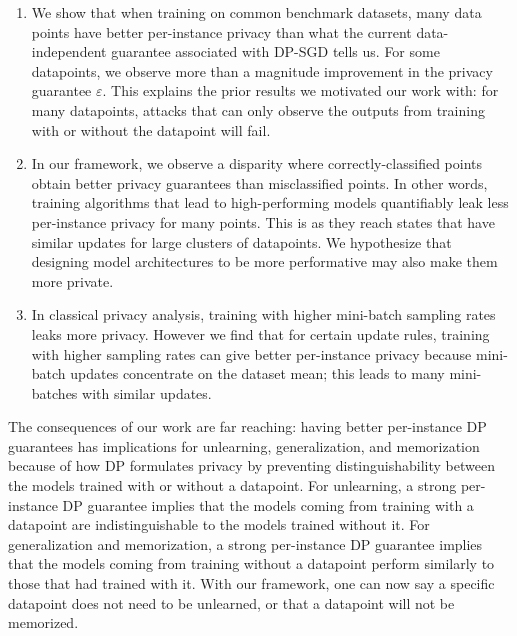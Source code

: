 \begin{enumerate}[leftmargin=*,noitemsep,topsep=0pt]
    \item We show that when training on common benchmark datasets, many data points have better per-instance privacy than what the current data-independent guarantee associated with DP-SGD tells us.
    For some datapoints, we observe more than a magnitude improvement in the privacy guarantee  $\varepsilon$. %
    This explains the prior results we motivated our work with: for many datapoints, attacks that can only observe the outputs from training with or without the datapoint will fail.
    
    \item  In our framework, we observe a disparity where correctly-classified points obtain better privacy guarantees than misclassified points. In other words, %
    training algorithms that lead to high-performing models quantifiably leak less per-instance privacy for many points. This is as they reach states that have similar updates for large clusters of datapoints. We hypothesize that %
    designing model architectures to be more performative may also make them more private.
    \item In classical privacy analysis, training with higher mini-batch sampling rates leaks more privacy. However we find that for certain update rules, training with higher sampling rates can give better per-instance privacy because mini-batch updates concentrate on the dataset mean; this leads to many mini-batches with similar updates. 
    
\end{enumerate}
 
 
 The consequences of our work are far reaching: having better per-instance DP guarantees has implications for unlearning, generalization, and memorization because of how DP formulates privacy by preventing distinguishability between the models trained with or without a datapoint. %
 For unlearning, a strong per-instance DP guarantee implies that the models coming from training with a datapoint are indistinguishable to the models trained without it. For generalization and memorization, a strong per-instance DP guarantee implies that the models coming from training without a datapoint perform similarly to those that had trained with it. With our framework, one can now say a specific datapoint does not need to be unlearned, or that a datapoint will not be memorized. 
 
 




















 
